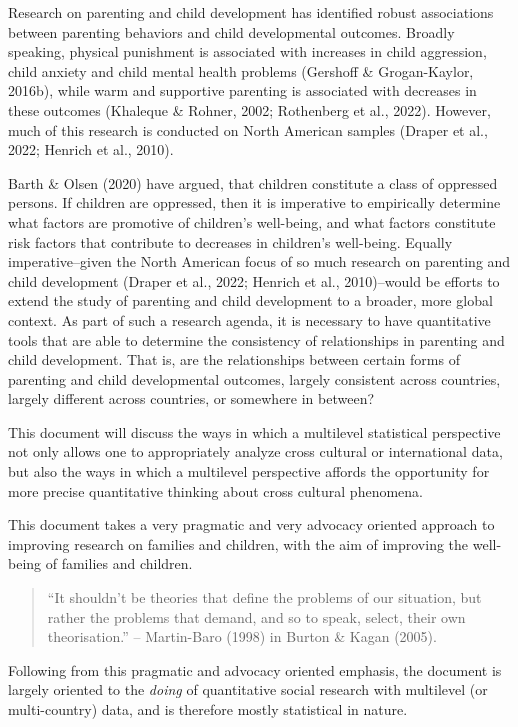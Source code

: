 \documentclass[
  letterpaper,
  DIV=11,
  numbers=noendperiod]{scrreprt}
\begin{document}
Research on parenting and child development has identified robust
associations between parenting behaviors and child developmental
outcomes. Broadly speaking, physical punishment is associated with
increases in child aggression, child anxiety and child mental health
problems (Gershoff \& Grogan-Kaylor, 2016b), while warm and supportive
parenting is associated with decreases in these outcomes (Khaleque \&
Rohner, 2002; Rothenberg et al., 2022). However, much of this research
is conducted on North American samples (Draper et al., 2022; Henrich et
al., 2010).

Barth \& Olsen (2020) have argued, that children constitute a class of
oppressed persons. If children are oppressed, then it is imperative to
empirically determine what factors are promotive of children's
well-being, and what factors constitute risk factors that contribute to
decreases in children's well-being. Equally imperative--given the North
American focus of so much research on parenting and child development
(Draper et al., 2022; Henrich et al., 2010)--would be efforts to extend
the study of parenting and child development to a broader, more global
context. As part of such a research agenda, it is necessary to have
quantitative tools that are able to determine the consistency of
relationships in parenting and child development. That is, are the
relationships between certain forms of parenting and child developmental
outcomes, largely consistent across countries, largely different across
countries, or somewhere in between?

This document will discuss the ways in which a multilevel statistical
perspective not only allows one to appropriately analyze cross cultural
or international data, but also the ways in which a multilevel
perspective affords the opportunity for more precise quantitative
thinking about cross cultural phenomena.

This document takes a very pragmatic and very advocacy oriented approach
to improving research on families and children, with the aim of
improving the well-being of families and children.

\begin{quote}
``It shouldn't be theories that define the problems of our situation,
but rather the problems that demand, and so to speak, select, their own
theorisation.'' -- Martin-Baro (1998) in Burton \& Kagan (2005).
\end{quote}

Following from this pragmatic and advocacy oriented emphasis, the
document is largely oriented to the \emph{doing} of quantitative social
research with multilevel (or multi-country) data, and is therefore
mostly statistical in nature.
\end{document}
